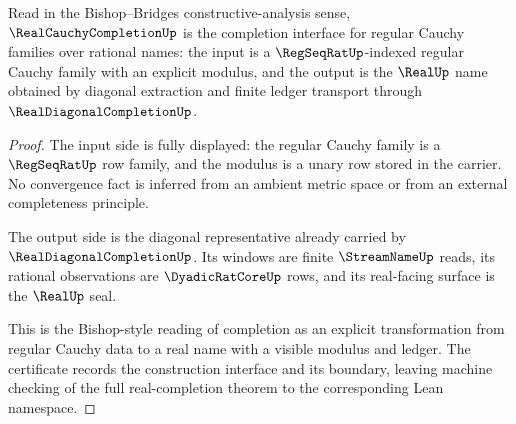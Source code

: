 \begin{theorem}
\label{thm:real-cauchy-completion-standard-bishop-reading}
Read in the Bishop--Bridges constructive-analysis sense, $\RealCauchyCompletionUp$ is the completion interface for regular Cauchy families over rational names: the input is a $\RegSeqRatUp$-indexed regular Cauchy family with an explicit modulus, and the output is the $\RealUp$ name obtained by diagonal extraction and finite ledger transport through $\RealDiagonalCompletionUp$.
\end{theorem}
\begin{proof}
The input side is fully displayed: the regular Cauchy family is a $\RegSeqRatUp$ row family, and the modulus is a unary row stored in the carrier. No convergence fact is inferred from an ambient metric space or from an external completeness principle.

The output side is the diagonal representative already carried by $\RealDiagonalCompletionUp$. Its windows are finite $\StreamNameUp$ reads, its rational observations are $\DyadicRatCoreUp$ rows, and its real-facing surface is the $\RealUp$ seal.

This is the Bishop-style reading of completion as an explicit transformation from regular Cauchy data to a real name with a visible modulus and ledger. The certificate records the construction interface and its boundary, leaving machine checking of the full real-completion theorem to the corresponding Lean namespace.
\end{proof}

